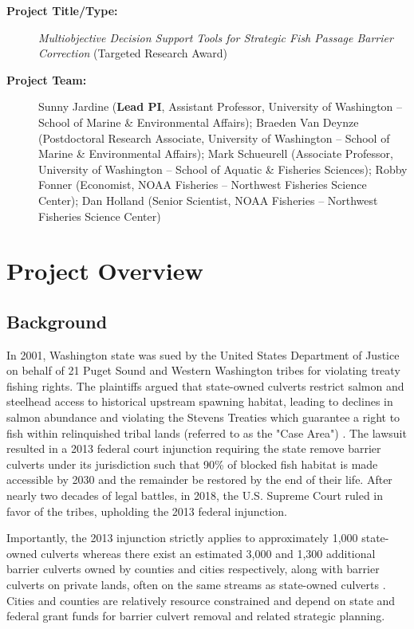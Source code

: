 \documentclass[12pt]{elsarticle}
\begin{document}
	
	\begin{description}
		\item[\textbf{Project Title/Type:}] \textit{Multiobjective Decision Support Tools for Strategic Fish Passage Barrier Correction} (Targeted Research Award)

		\item[\textbf{Project Team:}] Sunny Jardine (\textbf{Lead PI}, Assistant Professor, University of Washington -- School of Marine \& Environmental Affairs); Braeden Van Deynze  (Postdoctoral Research Associate, University of Washington -- School of Marine \& Environmental Affairs); Mark Schueurell  (Associate Professor, University of Washington -- School of Aquatic \& Fisheries Sciences); Robby Fonner (Economist, NOAA Fisheries -- Northwest Fisheries Science Center); Dan Holland (Senior Scientist, NOAA Fisheries -- Northwest Fisheries Science Center)
		
	\end{description}

	
	\section{Project Overview}
	\subsection{Background} 
	In 2001, Washington state was sued by the United States Department of Justice on behalf of 21 Puget Sound and Western Washington tribes for violating treaty fishing rights. The plaintiffs argued that state-owned culverts restrict salmon and steelhead access to historical upstream spawning habitat, leading to declines in salmon abundance and violating the Stevens Treaties which guarantee a right to fish within relinquished tribal lands (referred to as the "Case Area") \citep{hickey2018highway}. The lawsuit resulted in a 2013 federal court injunction requiring the state remove barrier culverts under its jurisdiction such that 90\% of blocked fish habitat is made accessible by 2030 and the remainder be restored by the end of their life. After nearly two decades of legal battles, in 2018, the U.S. Supreme Court ruled in favor of the tribes, upholding the 2013 federal injunction. 
	
	Importantly, the 2013 injunction strictly applies to approximately 1,000 state-owned culverts whereas there exist an estimated 3,000 and 1,300 additional barrier culverts owned by counties and cities respectively, along with barrier culverts on private lands, often on the same streams as state-owned culverts \citep{brown2019coming}. Cities and counties are relatively resource constrained and depend on state and federal grant funds for barrier culvert removal and related strategic planning. 
	
\end{document}
